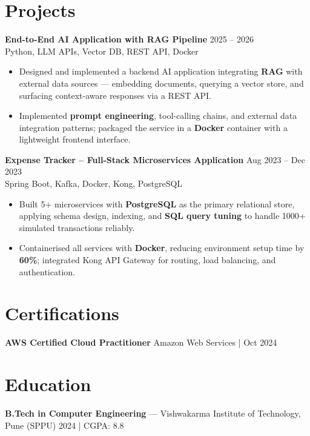 \documentclass[10pt,letterpaper]{article}
\newcommand{\resumeSubheading}[4]{%
  \textbf{#1} \hfill #2 \\
  #3 \hfill #4 \\
}
\begin{document}
\section*{Projects}

\resumeSubheading{End-to-End AI Application with RAG Pipeline}{2025 -- 2026}{}{Python, LLM APIs, Vector DB, REST API, Docker}
\begin{itemize}
    \item Designed and implemented a backend AI application integrating \textbf{RAG} with external data sources --- embedding documents, querying a vector store, and surfacing context-aware responses via a REST API.
    \item Implemented \textbf{prompt engineering}, tool-calling chains, and external data integration patterns; packaged the service in a \textbf{Docker} container with a lightweight frontend interface.
\end{itemize}

\resumeSubheading{Expense Tracker -- Full-Stack Microservices Application}{Aug 2023 -- Dec 2023}{}{Spring Boot, Kafka, Docker, Kong, PostgreSQL}
\begin{itemize}
    \item Built 5+ microservices with \textbf{PostgreSQL} as the primary relational store, applying schema design, indexing, and \textbf{SQL query tuning} to handle 1000+ simulated transactions reliably.
    \item Containerised all services with \textbf{Docker}, reducing environment setup time by \textbf{60\%}; integrated Kong API Gateway for routing, load balancing, and authentication.
\end{itemize}

\section*{Certifications}
\textbf{AWS Certified Cloud Practitioner} \hfill Amazon Web Services \;|\; Oct 2024

\section*{Education}
\textbf{B.Tech in Computer Engineering} --- Vishwakarma Institute of Technology, Pune (SPPU) \hfill 2024 \;|\; CGPA: 8.8
\end{document}
